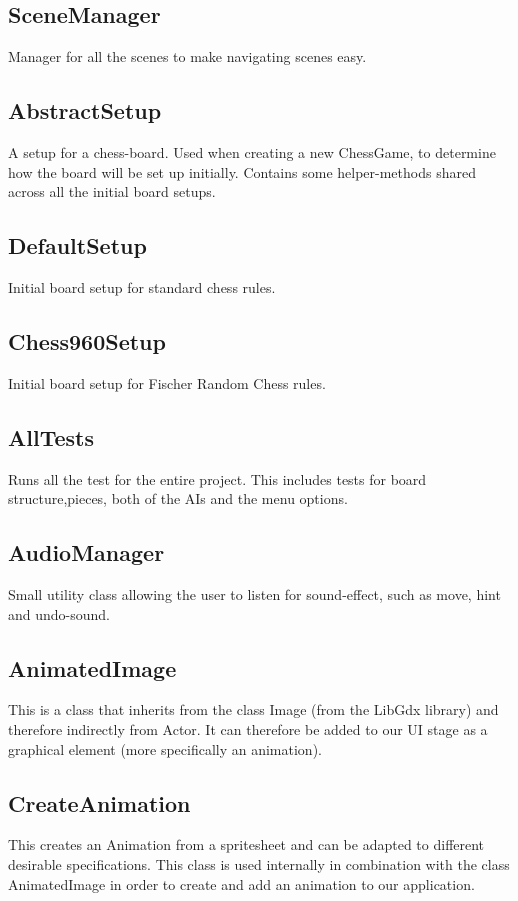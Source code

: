 \documentclass{article}
\begin{document}
\subsection {SceneManager}
Manager for all the scenes to make navigating scenes easy.

\subsection {AbstractSetup}
A setup for a chess-board. Used when creating a new ChessGame, to determine how the board will be set up initially. Contains some helper-methods shared across all the initial board setups.

\subsection {DefaultSetup}
Initial board setup for standard chess rules.

\subsection {Chess960Setup}
Initial board setup for Fischer Random Chess rules.

\subsection {AllTests}
Runs all the test for the entire project. This includes tests for board structure,pieces, both of the AIs and the menu options.

\subsection {AudioManager}
Small utility class allowing the user to listen for sound-effect, such as move, hint and undo-sound.

\subsection {AnimatedImage}
This is a class that inherits from the class Image (from the LibGdx library) and therefore indirectly from Actor. It can therefore be added to our UI stage as a graphical element (more specifically an animation).

\subsection {CreateAnimation}
This creates an Animation from a spritesheet and can be adapted to different desirable specifications. This class is used internally in combination with the class AnimatedImage in order to create and add an animation to our application.
\end{document}
